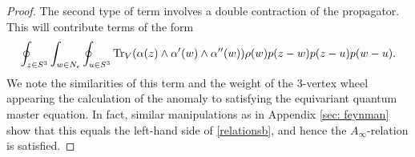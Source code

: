 \begin{proof}
The second type of term involves a double contraction of the propagator. 
This will contribute terms of the form
\[
\oint_{z \in S^3} \int_{w \in N_\epsilon} \oint_{u \in S^3} {\rm Tr}_V(\alpha(z) \wedge \alpha'(w) \wedge \alpha''(w)) \rho(w) p(z-w) p(z-u) p(w-u) .
\]
We note the similarities of this term and the weight of the $3$-vertex wheel appearing the calculation of the anomaly to satisfying the equivariant quantum master equation. 
In fact, similar manipulations as in Appendix \ref{sec: feynman} show that this equals the left-hand side of \ref{relationsb}, and hence the $A_\infty$-relation is satisfied.
%
\end{proof}


